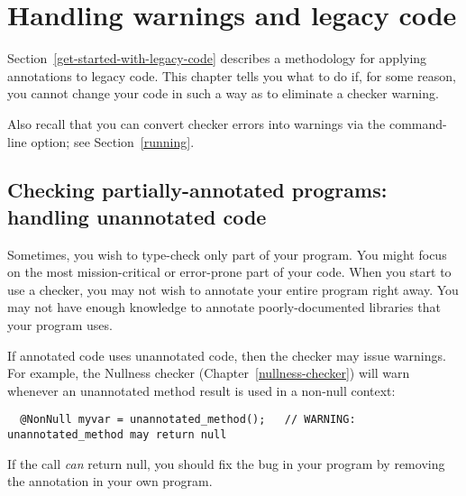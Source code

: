 \htmlhr
\chapter{Handling warnings and legacy code\label{warnings-and-legacy}}

Section~\ref{get-started-with-legacy-code} describes a methodology for
applying annotations to legacy code.  This chapter tells you what to do if,
for some reason, you cannot change your code in such a way as to eliminate
a checker warning.

Also recall that you can convert checker errors into warnings via the
 command-line option; see Section~\ref{running}.


\section{Checking partially-annotated programs:  handling unannotated code\label{unannotated-code}}

Sometimes, you wish to type-check only part of your program.
You might focus on the most mission-critical or error-prone part of your
code.  When you start to use a checker, you may not wish to annotate
your entire program right away.
You may not have
enough knowledge to annotate poorly-documented libraries that your program uses.

If annotated code uses unannotated code, then the checker may issue
warnings.  For example, the Nullness checker (Chapter~\ref{nullness-checker}) will
warn whenever an unannotated method result is used in a non-null context:

\begin{Verbatim}
  @NonNull myvar = unannotated_method();   // WARNING: unannotated_method may return null
\end{Verbatim}

If the call \emph{can} return null, you should fix the bug in your program by
removing the  annotation in your own program.

